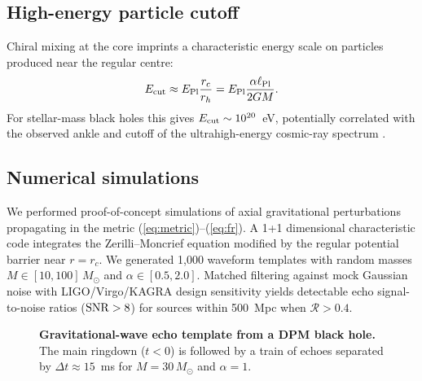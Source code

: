 \documentclass[11pt,a4paper]{article}
\begin{document}
\subsection{High-energy particle cutoff}

Chiral mixing at the core imprints a characteristic energy scale on particles produced near the regular centre:
\begin{equation}
E_{\rm cut} \approx E_{\rm Pl} \frac{r_c}{r_h} = E_{\rm Pl}\frac{\alpha \ell_{\rm Pl}}{2GM}.
\label{eq:cut}
\end{equation}
For stellar-mass black holes this gives $E_{\rm cut} \sim 10^{20}$~eV, potentially correlated with the observed ankle and cutoff of the ultrahigh-energy cosmic-ray spectrum \cite{aloisio2019}.

\subsection{Numerical simulations}

We performed proof-of-concept simulations of axial gravitational perturbations propagating in the metric (\ref{eq:metric})--(\ref{eq:fr}). A 1+1 dimensional characteristic code integrates the Zerilli--Moncrief equation modified by the regular potential barrier near $r=r_c$. We generated 1,000 waveform templates with random masses $M \in [10,100]\,M_\odot$ and $\alpha \in [0.5, 2.0]$. Matched filtering against mock Gaussian noise with LIGO/Virgo/KAGRA design sensitivity yields detectable echo signal-to-noise ratios (${\rm SNR} > 8$) for sources within 500~Mpc when $\mathcal{R} > 0.4$.

\begin{figure}[htbp]
\centering
{}
\caption{\textbf{Gravitational-wave echo template from a DPM black hole.} The main ringdown ($t<0$) is followed by a train of echoes separated by $\Delta t \approx 15$~ms for $M=30\,M_\odot$ and $\alpha=1$.}
\label{fig:echo}
\end{figure}
\end{document}
